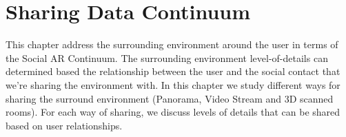 \chapter{Sharing Data Continuum} %
\label{ch:data} %

This chapter address the surrounding environment around the user in terms of the Social AR Continuum. The surrounding environment level-of-details can determined based the relationship between the user and the social contact that we're sharing the environment with. In this chapter we study different ways for sharing the surround environment (Panorama, Video Stream and 3D scanned rooms). For each way of sharing, we discuss levels of details that can be shared based on user relationships. 





